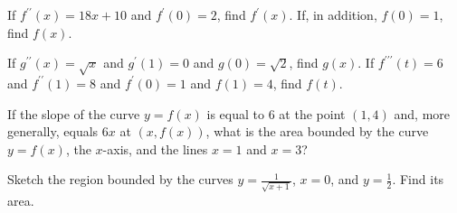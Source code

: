 \begin{exercises}
If $f^{\prime\prime}(x) = 18x + 10$ and
$f^\prime(0) = 2$, find $f^\prime(x)$.
If, in addition, $f(0) = 1$, find $f(x)$.

\begin{exenum}
\x
If $g^{\prime\prime}(x) = \sqrt x$ and
$g^\prime (1) = 0$ and $g(0) = \sqrt2$,
find $g(x)$.
\x
If $f^{\prime\prime\prime}(t) = 6$ and
$f^{\prime\prime}(1) = 8$ and $f^\prime(0) = 1$
and $f(1) = 4$, find $f(t)$.
\end{exenum}

If the slope of the curve $y = f(x)$
is equal to $6$ at the point $(1,4)$ and,
more generally, equals $6x$ at $(x,f(x))$,
what is the area bounded by the curve $y = f(x)$,
the $x$-axis, and the lines $x = 1$ and $x = 3$?

Sketch the region bounded by the curves
$y = \frac1{\sqrt{x + 1}}$, $x = 0$, and $y = \frac12$.
Find its area.

\end{exercises}

